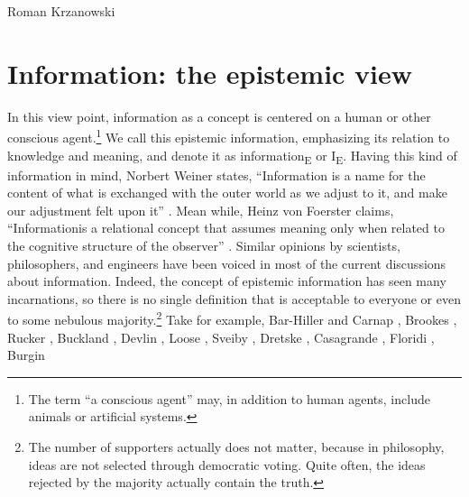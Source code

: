 \begin{artengenv}{Roman Krzanowski}
\section{Information: the epistemic view}
In this view point, information as a concept is centered on a human or other conscious agent.\footnote{The term ``a conscious agent'' may, in addition to human agents, include animals or artificial systems.} We call this epistemic information, emphasizing its relation to knowledge and meaning, and denote it as information\textsubscript{E} or I\textsubscript{E}. Having this kind of information in mind, Norbert Weiner states, ``Information is a name for the content of what is exchanged with the outer world as we adjust to it, and make our adjustment felt upon it''
\parencite[][p.17]{wiener_human_1989}. %
 Mean while, Heinz von Foerster claims, ``Informationis a relational concept that assumes meaning only when related to the cognitive structure of the observer'' 
\parencite[][p.3]{foerster_epistemology_1980}. %
 Similar opinions by scientists, philosophers, and engineers have been voiced in most of the current discussions about information. Indeed, the concept of epistemic information has seen many incarnations, so there is no single definition that is acceptable to everyone or even to some nebulous majority.\footnote{The number of supporters actually does not matter, because in philosophy, ideas are not selected through democratic voting. Quite often, the ideas rejected by the majority actually contain the truth.} Take for example, Bar-Hiller and Carnap 
\parencite*[][]{bar-hillel_semantic_1953}, %
 Brookes 
\parencite*[][]{brookes_foundations_1980}, %
 Rucker 
\parencite*[][]{rucker_mind_2013}, %
Buckland
\parencite*[][]{buckland_information_1991}, %
 Devlin 
\parencite*[][]{devlin_logic_1991}, %
 Loose 
\parencite*[][]{losee_discipline_1997}, %
 Sveiby 
\parencite*[][]{sveiby_what_1998}, %
 Dretske 
\parencite*[][]{dretske_knowledge_1999}, %
 Casagrande 
\parencite*[][]{casagrande_information_1999}, %
 Floridi 
\parencites*[][]{floridi_information_2010}[][]{floridi_philosophy_2010}, %
Burgin

\end{artengenv}
